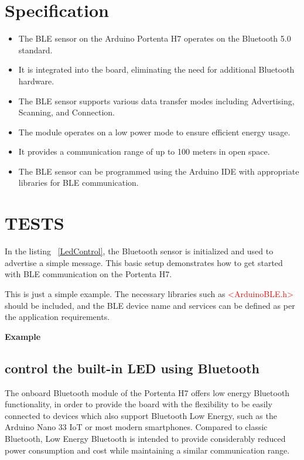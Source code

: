 \section{Specification}

\begin{itemize}
	
	\item The BLE sensor on the Arduino Portenta H7 operates on the Bluetooth 5.0 standard.
	\item It is integrated into the board, eliminating the need for additional Bluetooth hardware.
	\item The BLE sensor supports various data transfer modes including Advertising, Scanning, and Connection.
	\item The module operates on a low power mode to ensure efficient energy usage.
	\item It provides a communication range of up to 100 meters in open space.
	\item The BLE sensor can be programmed using the Arduino IDE with appropriate libraries for BLE communication. \cite{bluetoothPortentaH7:2024}
	
\end{itemize}


\section{TESTS}
In the listing  ~\ref{LedControl}, the Bluetooth sensor is initialized and used to advertise a simple message. This basic setup demonstrates how to get started with BLE communication on the Portenta H7.

{
	\label{LedControl}
}


This is just a simple example. The necessary libraries such as \textcolor{red}{<ArduinoBLE.h>} should be included, and the BLE device name and services can be defined as per the application requirements. \cite{bluetoothPortentaH7:2024}


\textbf{Example}

\subsection{control the built-in LED using Bluetooth}
The onboard Bluetooth module of the Portenta H7 offers low energy Bluetooth functionality, in order to provide the board with the flexibility to be easily connected to devices which also support Bluetooth Low Energy, such as the Arduino Nano 33 IoT or most modern smartphones. Compared to classic Bluetooth, Low Energy Bluetooth is intended to provide considerably reduced power consumption and cost while maintaining a similar communication range. \cite{bluetoothPortentaH7:2024}

